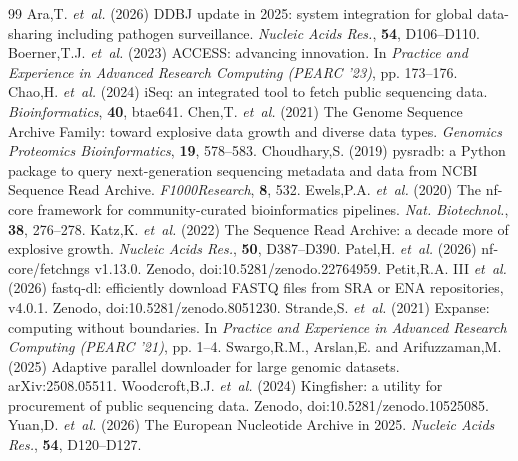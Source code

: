 \begin{thebibliography}{99}\small
{} Ara,T. {\it et~al.} (2026) DDBJ update in 2025: system integration for global data-sharing including pathogen surveillance. {\it Nucleic Acids Res.}, {\bf 54}, D106--D110.
 Boerner,T.J. {\it et~al.} (2023) ACCESS: advancing innovation. In {\it Practice and Experience in Advanced Research Computing (PEARC '23)}, pp. 173--176.
 Chao,H. {\it et~al.} (2024) iSeq: an integrated tool to fetch public sequencing data. {\it Bioinformatics}, {\bf 40}, btae641.
 Chen,T. {\it et~al.} (2021) The Genome Sequence Archive Family: toward explosive data growth and diverse data types. {\it Genomics Proteomics Bioinformatics}, {\bf 19}, 578--583.
 Choudhary,S. (2019) pysradb: a Python package to query next-generation sequencing metadata and data from NCBI Sequence Read Archive. {\it F1000Research}, {\bf 8}, 532.
 Ewels,P.A. {\it et~al.} (2020) The nf-core framework for community-curated bioinformatics pipelines. {\it Nat. Biotechnol.}, {\bf 38}, 276--278.
 Katz,K. {\it et~al.} (2022) The Sequence Read Archive: a decade more of explosive growth. {\it Nucleic Acids Res.}, {\bf 50}, D387--D390.
 Patel,H. {\it et~al.} (2026) nf-core/fetchngs v1.13.0. Zenodo, doi:10.5281/zenodo.22764959.
 Petit,R.A. III {\it et~al.} (2026) fastq-dl: efficiently download FASTQ files from SRA or ENA repositories, v4.0.1. Zenodo, doi:10.5281/zenodo.8051230.
 Strande,S. {\it et~al.} (2021) Expanse: computing without boundaries. In {\it Practice and Experience in Advanced Research Computing (PEARC '21)}, pp. 1--4.
 Swargo,R.M., Arslan,E. and Arifuzzaman,M. (2025) Adaptive parallel downloader for large genomic datasets. arXiv:2508.05511.
 Woodcroft,B.J. {\it et~al.} (2024) Kingfisher: a utility for procurement of public sequencing data. Zenodo, doi:10.5281/zenodo.10525085.
 Yuan,D. {\it et~al.} (2026) The European Nucleotide Archive in 2025. {\it Nucleic Acids Res.}, {\bf 54}, D120--D127.
\end{thebibliography}
